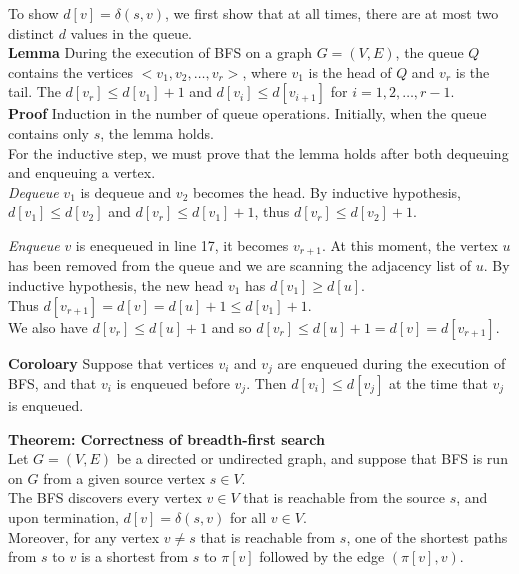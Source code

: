 \documentclass{beamer}
\begin{document}
\begin{frame}{}

To show $d[v]=\delta(s,v)$, we first show that at all times, there are at
most two distinct $d$ values in the queue.  \\
{\bf Lemma} During the execution of BFS on a graph $G=(V,E)$, the queue
 $Q$ contains the vertices $<v_1,v_2,\ldots,v_r>$, where $v_1$ is the head of
 $Q$ and $v_r$ is the tail.  The $d[v_r]\le d[v_1]+1$
 and $d[v_i]\le d[v_{i+1}]$
 for $i=1,2,\ldots,r-1$.  \\
{\bf Proof} Induction in the number of queue operations.  Initially, when
the queue contains only $s$, the lemma holds.  \\
For the inductive step, we must prove that the lemma holds after both dequeuing
and enqueuing a vertex.  \\
{\it Dequeue} $v_1$ is dequeue and $v_2$ becomes the head.  By inductive
 hypothesis, $d[v_1]\le d[v_2]$ and $d[v_r]\le d[v_1]+1$, thus $d[v_r]\le
d[v_2]+1$.  \\
\end{frame}

\begin{frame}{}

{\it Enqueue} $v$ is enequeued in line 17, it becomes $v_{r+1}$.  At this
moment, the vertex $u$ has been removed from the queue and we are scanning
the adjacency list of $u$.  By inductive hypothesis, the new head
 $v_1$ has $d[v_1] \ge d[u]$.  \\
Thus $d[v_{r+1}]=d[v]=d[u]+1\le d[v_1]+1$.  \\
We also have $d[v_r]\le d[u]+1$ and so $d[v_r]\le d[u]+1 = d[v] = d[v_{r+1}]$.
\end{frame}

\begin{frame}{}

{\bf Coroloary}
Suppose that vertices $v_i$ and $v_j$ are enqueued during the execution of
BFS, and that $v_i$ is enqueued before $v_j$.  Then $d[v_i]\le d[v_j]$ at
the time that $v_j$ is enqueued.  
\end{frame}

\begin{frame}{}

{\bf Theorem: Correctness of breadth-first search}\\
Let $G=(V,E)$ be a directed or undirected graph, and suppose that BFS is run
on $G$ from a given source vertex $s\in V$.  \\
The BFS discovers every vertex
$v\in V$ that is reachable from the source $s$, and upon termination,
$d[v]=\delta(s,v)$ for all $v\in V$. \\
Moreover, for any vertex $v\ne s$ that is reachable from $s$, one of the 
 shortest paths from $s$ to $v$ is a shortest from $s$ to $\pi[v]$ followed
by the edge $(\pi[v],v)$.  
\end{frame}
\end{document}
